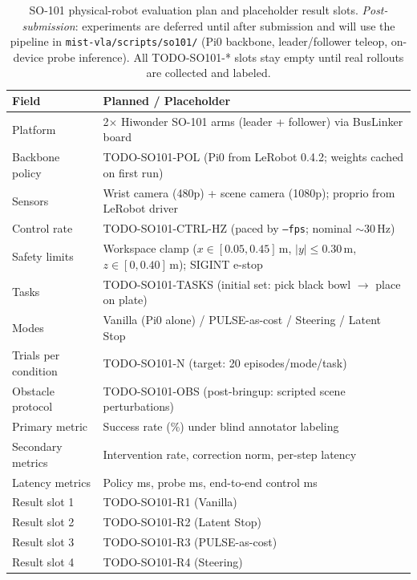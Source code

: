 \begin{table}[t]
\centering
\caption{SO-101 physical-robot evaluation plan and placeholder result slots. \emph{Post-submission}: experiments are deferred until after submission and will use the pipeline in \texttt{mist-vla/scripts/so101/} (Pi0 backbone, leader/follower teleop, on-device probe inference). All TODO-SO101-* slots stay empty until real rollouts are collected and labeled.}
\label{tab:so101_plan}
\begin{tabular}{ll}
\toprule
Field & Planned / Placeholder \\
\midrule
Platform & 2$\times$ Hiwonder SO-101 arms (leader + follower) via BusLinker board \\
Backbone policy & TODO-SO101-POL (Pi0 from LeRobot 0.4.2; weights cached on first run) \\
Sensors & Wrist camera (480p) + scene camera (1080p); proprio from LeRobot driver \\
Control rate & TODO-SO101-CTRL-HZ (paced by \texttt{--fps}; nominal $\sim 30$\,Hz) \\
Safety limits & Workspace clamp ($x{\in}[0.05,0.45]$\,m, $|y|{\leq}0.30$\,m, $z{\in}[0,0.40]$\,m); SIGINT e-stop \\
Tasks & TODO-SO101-TASKS (initial set: pick black bowl $\to$ place on plate) \\
Modes & Vanilla (Pi0 alone) / PULSE-as-cost / Steering / Latent Stop \\
Trials per condition & TODO-SO101-N (target: 20 episodes/mode/task) \\
Obstacle protocol & TODO-SO101-OBS (post-bringup: scripted scene perturbations) \\
Primary metric & Success rate (\%) under blind annotator labeling \\
Secondary metrics & Intervention rate, correction norm, per-step latency \\
Latency metrics & Policy ms, probe ms, end-to-end control ms \\
Result slot 1 & TODO-SO101-R1 (Vanilla) \\
Result slot 2 & TODO-SO101-R2 (Latent Stop) \\
Result slot 3 & TODO-SO101-R3 (PULSE-as-cost) \\
Result slot 4 & TODO-SO101-R4 (Steering) \\
\bottomrule
\end{tabular}
\end{table}
